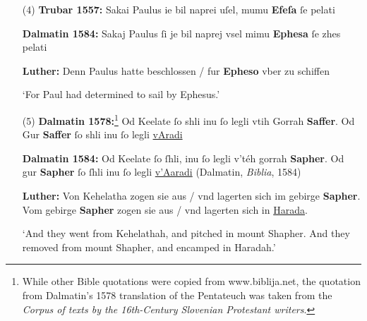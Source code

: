 \documentclass[output=paper,colorlinks,citecolor=brown,arabicfont,chinesefont]{langscibook}
\begin{document}
\begin{itemize}
    \item[(4)]\textbf{Trubar 1557:} Sakai Paulus ie bil naprei uſel, mumu \textbf{Efeſa} ſe pelati
    
    \textbf{Dalmatin 1584:} Sakaj Paulus ſi je bil naprej vsel mimu \textbf{Ephesa} ſe zhes pelati

    \textbf{Luther:} Denn Paulus hatte beschlossen / fur \textbf{Epheso} vber zu schiffen 
    
    ‘For Paul had determined to sail by Ephesus.’
    \item[(5)]\textbf{Dalmatin 1578:}\footnote{While other Bible quotations were copied from www.biblija.net, the quotation from Dalmatin's 1578 translation of the Pentateuch was taken from the \emph{Corpus of texts by the 16th-Century Slovenian Protestant writers}.}  Od Keelate ſo shli inu ſo legli vtih Gorrah \textbf{Saffer}. Od Gur \textbf{Saffer} ſo shli inu ſo legli \uline{vAradi}
    
    \textbf{Dalmatin 1584:} Od Keelate ſo ſhli, inu ſo legli v'téh gorrah \textbf{Sapher}. Od gur \textbf{Sapher} ſo ſhli inu ſo legli \uline{v'Aaradi} (Dalmatin, \emph{Biblia}, 1584)
    
    \textbf{Luther:} Von Kehelatha zogen sie aus / vnd lagerten sich im gebirge \textbf{Sapher}. Vom gebirge \textbf{Sapher} zogen sie aus / vnd lagerten sich in \uline{Harada}.
    
    ‘And they went from Kehelathah, and pitched in mount Shapher.  And they removed from mount Shapher, and encamped in Haradah.’
\end{itemize}
\end{document}
